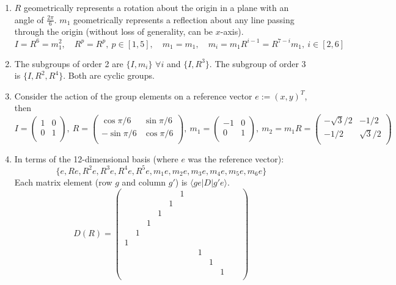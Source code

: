 \documentclass[a4paper]{article}
\begin{document}
\newpage
\begin{ans}\leavevmode
\begin{enumerate}[label=(\alph*)]
\item $R$ geometrically represents a rotation about the origin in a plane with an angle of $\frac{2\pi}{6}$. $m_1$ geometrically represents a reflection about any line passing through the origin (without loss of generality, can be $x$-axis).
$$I=R^6=m_1^2,\quad R^p=R^p,~p\in[1,5],\quad m_1=m_1,\quad m_i=m_1R^{i-1}=R^{7-i}m_1,~i\in[2,6]$$
\item The subgroups of order 2 are $\{I,m_i\}$ $\forall i$ and $\{I,R^3\}$. The subgroup of order 3 is $\{I,R^2,R^4\}$. Both are cyclic groups.
\item Consider the action of the group elements on a reference vector $e:=(x,y)^T$, then
$$I=\begin{pmatrix}1&0\\0&1\\\end{pmatrix},~R=\begin{pmatrix}\cos\pi/6 &\sin\pi/6\\-\sin\pi/6&\cos\pi/6\\\end{pmatrix},~m_1=\begin{pmatrix}-1&0\\0&1\\\end{pmatrix},~m_2=m_1R=\begin{pmatrix}-\sqrt{3}/2&-1/2\\-1/2&\sqrt{3}/2\\\end{pmatrix}$$
\item In terms of the 12-dimensional basis (where $e$ was the reference vector): 
$$\{e,Re,R^2e,R^3e,R^4e,R^5e,m_1e,m_2e,m_3e,m_4e,m_5e,m_6e\}$$
Each matrix element (row $g$ and column $g'$) is $\langle ge|D|g'e\rangle$.
\setcounter{MaxMatrixCols}{20}
$$D(R)=\begin{pmatrix}
& & & & &1 & & & & & &\\
& & & &1 & & & & & & &\\
& & &1 & & & & & & & &\\
& &1 & & & & & & & & &\\
& 1& & & & & & & & & &\\
1& & & & & & & & & & &\\
& & & & & & &1 & & & &\\
& & & & & & & &1 & & &\\
& & & & & & & & &1 & &\\

\end{pmatrix}$$
\end{enumerate}
\end{ans}
\end{document}
